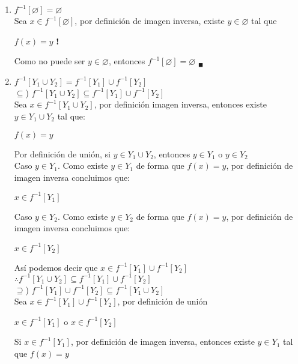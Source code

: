 \documentclass[12pt]{article}
\begin{document}
\begin{enumerate}[label=\alph*)]
    \item ${ f^{-1}} [\varnothing] = \varnothing$\\

    Sea $x \in f^{-1}[\varnothing]$, por definición de imagen inversa, existe $y \in \varnothing$ tal que 
    \begin{center}
        $f(x) = y$ \textbf{!}\\
    \end{center}
    Como no puede ser $y \in \varnothing$, entonces $f^{-1}[\varnothing] = \varnothing$ $_\blacksquare$

    \item $f^{-1} [Y_1 \cup Y_2] =  f^{-1}[Y_1] \cup f^{-1}[Y_2]$\\

    $\subseteq$) $ f^{-1} [Y_1 \cup Y_2] \subseteq  f^{-1}[Y_1] \cup  f^{-1}[Y_2]$\\

    Sea $x \in f^{-1} [Y_1 \cup Y_2]$, por definición imagen inversa, entonces existe $y \in Y_1 \cup Y_2$ tal que:
    \begin{center}
        $f(x) = y$\\
    \end{center}
    Por definición de unión, si $y \in Y_1 \cup Y_2$, entonces $y \in Y_1$ o $y \in Y_2$\\

    Caso $y \in Y_1$. Como existe $y \in Y_1$ de forma que $f(x) = y$, por definición de imagen inversa concluimos que:
    \begin{center}
        $x \in f^{-1}[Y_1]$
    \end{center}
    Caso $y \in Y_2$. Como existe $y \in Y_2$ de forma que $f(x) = y$, por definición de imagen inversa concluimos que:
    \begin{center}
        $x \in f^{-1}[Y_2]$
    \end{center}
    Así podemos decir que $x \in f^{-1}[Y_1] \cup f^{-1}[Y_2]$\\

    $\therefore f^{-1} [Y_1 \cup Y_2] \subseteq  f^{-1}[Y_1] \cup  f^{-1}[Y_2]$\\

    $\supseteq$) $f^{-1}[Y_1] \cup f^{-1}[Y_2] \subseteq f^{-1} [Y_1 \cup Y_2]$\\

    Sea $x \in f^{-1}[Y_1] \cup f^{-1}[Y_2]$, por definición de unión
    \begin{center}
        $x \in f^{-1}[Y_1]$ o $x \in f^{-1}[Y_2]$
    \end{center}
    Si $x \in f^{-1}[Y_1]$, por definición de imagen inversa, entonces existe $y \in Y_1$ tal que $f(x) = y$\\


\end{enumerate}
\end{document}
